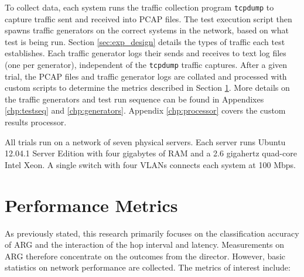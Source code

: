 \par To collect data, each system runs the traffic collection program \texttt{tcpdump} to capture traffic sent and received into \ac{PCAP} files. The test execution script then spawns traffic generators on the correct systems in the network, based on what test is being run. Section \ref{sec:exp_design} details the types of traffic each test establishes. Each traffic generator logs their sends and receives to text log files (one per generator), independent of the \texttt{tcpdump} traffic captures. After a given trial, the \ac{PCAP} files and traffic generator logs are collated and processed with custom scripts to determine the metrics described in Section \ref{sec:metrics}. More details on the traffic generators and test run sequence can be found in Appendixes \ref{chp:testseq} and \ref{chp:generators}. Appendix \ref{chp:processor} covers the custom results processor.

\par All trials run on a network of seven physical servers. Each server runs Ubuntu 12.04.1 Server Edition with four gigabytes of \ac{RAM} and a 2.6 gigahertz quad-core Intel Xeon. A single switch with four \acp{VLAN} connects each system at 100 \ac{Mbps}.

\section{Performance Metrics}
\label{sec:metrics}
\par As previously stated, this research primarily focuses on the classification accuracy of \ac{ARG} and the interaction of the hop interval and latency. Measurements on \ac{ARG} therefore concentrate on the outcomes from the director. However, basic statistics on network performance are collected. The metrics of interest include:

